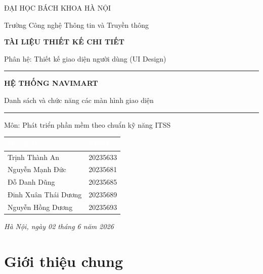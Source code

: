\documentclass[12pt,a4paper]{article}
\newcommand{\thead}[1]{\textbf{\textcolor{white}{#1}}}
\begin{document}
\begin{titlepage}
\centering
\vspace*{1.2cm}
{\large ĐẠI HỌC BÁCH KHOA HÀ NỘI\par}
{\large Trường Công nghệ Thông tin và Truyền thông\par}
\vspace{2.4cm}
{\large\bfseries TÀI LIỆU THIẾT KẾ CHI TIẾT\par}
{\normalsize Phân hệ: Thiết kế giao diện người dùng (UI Design)\par}
\vspace{1.4cm}
\rule{0.8\linewidth}{0.4pt}\par
\vspace{0.6cm}
{\Huge\bfseries\color{navy} HỆ THỐNG NAVIMART\par}
\vspace{0.5cm}
{\large Danh sách và chức năng các màn hình giao diện\par}
\vspace{0.4cm}
\rule{0.8\linewidth}{0.4pt}\par
\vspace{1.2cm}
{\large Môn: Phát triển phần mềm theo chuẩn kỹ năng ITSS\par}
\vspace{2cm}

\begin{tabular}{|l|l|}
\hline
\rowcolor{headerblue}
\thead{Họ và tên} & \thead{MSSV} \\
\hline
\rule{0pt}{2.4ex} Trịnh Thành An  & 20235633\\
\hline
\rule{0pt}{2.4ex} Nguyễn Mạnh Đức  & 20235681\\
\hline
\rule{0pt}{2.4ex} Đỗ Danh Dũng  & 20235685\\
\hline
\rule{0pt}{2.4ex} Đinh Xuân Thái Dương  & 20235689\\
\hline
\rule{0pt}{2.4ex}Nguyễn Hồng Dương   & 20235693\\
\hline
\end{tabular}

\vfill
{\itshape Hà Nội, ngày 02 tháng 6 năm 2026}
\end{titlepage}

\tableofcontents
\newpage

\section{Giới thiệu chung}
\end{document}
